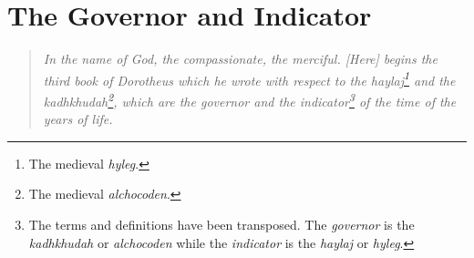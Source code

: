 \chapter{The Governor and Indicator}
\begin{quote}
\textsl{In the name of God, the compassionate, the merciful. [Here] begins the third book of Dorotheus which he wrote with respect to the haylaj\footnote{The medieval \textsl{hyleg}.} and the kadhkhudah\footnote{The medieval \textsl{alchocoden}.}, which are the governor and the indicator\footnote{The terms and definitions have been transposed. The \textsl{governor} is the \textsl{kadhkhudah} or \textsl{alchocoden} while the \textsl{indicator} is the \textsl{haylaj} or \textsl{hyleg}. } of the time of the years of life.}
\end{quote}

